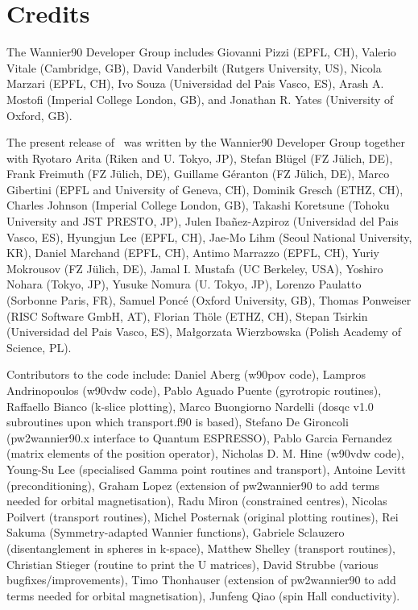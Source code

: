 \section*{Credits}
The Wannier90 Developer Group includes Giovanni Pizzi (EPFL, CH), 
Valerio Vitale (Cambridge, GB),
David Vanderbilt  (Rutgers University, US),
Nicola Marzari    (EPFL, CH),
Ivo Souza         (Universidad del Pais Vasco, ES),
Arash A. Mostofi  (Imperial College London, GB), and 
Jonathan R. Yates (University of Oxford, GB).

The present release of \wannier\ was written by the Wannier90 Developer Group together
with Ryotaro Arita (Riken and U. Tokyo, JP),
Stefan Bl\"ugel (FZ  J\"ulich, DE),
Frank Freimuth (FZ  J\"ulich, DE),
Guillame G\'eranton (FZ  J\"ulich, DE),
Marco Gibertini (EPFL and University of Geneva, CH),
Dominik Gresch (ETHZ, CH),
Charles Johnson (Imperial College London, GB),
Takashi Koretsune (Tohoku University and JST PRESTO, JP),
Julen Iba\~nez-Azpiroz (Universidad del Pais Vasco, ES),
Hyungjun Lee (EPFL, CH),
Jae-Mo Lihm (Seoul National University, KR),
Daniel Marchand (EPFL, CH),
Antimo Marrazzo (EPFL, CH),
Yuriy Mokrousov (FZ  J\"ulich, DE),
Jamal I. Mustafa (UC Berkeley, USA),
Yoshiro Nohara (Tokyo, JP),
Yusuke Nomura (U. Tokyo, JP),
Lorenzo Paulatto (Sorbonne Paris, FR),
Samuel Ponc\'e (Oxford University, GB),
Thomas Ponweiser (RISC Software GmbH, AT),
Florian Th\"ole (ETHZ, CH),
Stepan Tsirkin (Universidad del Pais Vasco, ES),
Ma\l{}gorzata Wierzbowska (Polish Academy of Science, PL).

Contributors to the code include:
Daniel Aberg (w90pov code), 
Lampros Andrinopoulos (w90vdw code),
Pablo Aguado Puente (gyrotropic routines),
Raffaello Bianco (k-slice plotting),
Marco Buongiorno Nardelli (dosqc v1.0 subroutines upon which transport.f90 is based),
Stefano De Gironcoli (pw2wannier90.x interface to Quantum ESPRESSO),
Pablo Garcia Fernandez (matrix elements of the position operator),
Nicholas D. M. Hine (w90vdw code),
Young-Su Lee (specialised Gamma point routines and transport),
Antoine Levitt (preconditioning),
Graham Lopez (extension of pw2wannier90 to add terms needed for orbital magnetisation),
Radu Miron (constrained centres),
Nicolas Poilvert (transport routines),
Michel Posternak (original plotting routines),
Rei Sakuma (Symmetry-adapted Wannier functions),
Gabriele Sclauzero (disentanglement in spheres in k-space),
Matthew Shelley (transport routines),
Christian Stieger (routine to print the U matrices),
David Strubbe (various bugfixes/improvements),
Timo Thonhauser (extension of pw2wannier90 to add terms needed for orbital magnetisation), Junfeng Qiao (spin Hall conductivity).

